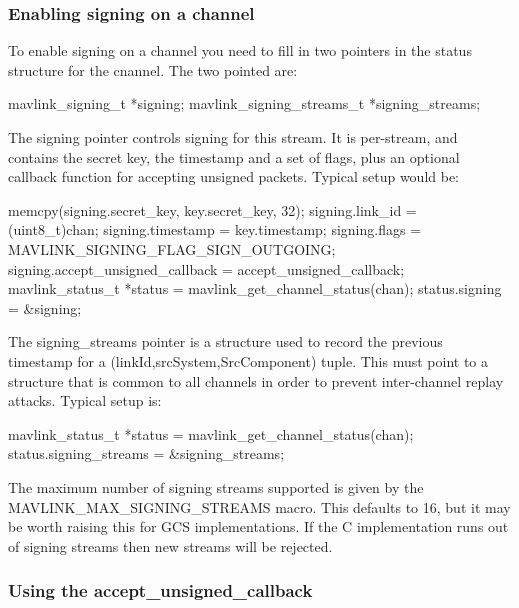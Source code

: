 \subsubsection*{Enabling signing on a channel}

To enable signing on a channel you need to fill in two pointers in the status structure for the cnannel. The two pointed are\+:


\begin{DoxyCode}
mavlink\_signing\_t *signing;
mavlink\_signing\_streams\_t *signing\_streams;
\end{DoxyCode}


The signing pointer controls signing for this stream. It is per-\/stream, and contains the secret key, the timestamp and a set of flags, plus an optional callback function for accepting unsigned packets. Typical setup would be\+:


\begin{DoxyCode}
memcpy(signing.secret\_key, key.secret\_key, 32);
signing.link\_id = (uint8\_t)chan;
signing.timestamp = key.timestamp;
signing.flags = MAVLINK\_SIGNING\_FLAG\_SIGN\_OUTGOING;
signing.accept\_unsigned\_callback = accept\_unsigned\_callback;
mavlink\_status\_t *status = mavlink\_get\_channel\_status(chan);
status.signing = &signing;
\end{DoxyCode}


The signing\+\_\+streams pointer is a structure used to record the previous timestamp for a (link\+Id,src\+System,Src\+Component) tuple. This must point to a structure that is common to all channels in order to prevent inter-\/channel replay attacks. Typical setup is\+:


\begin{DoxyCode}
mavlink\_status\_t *status = mavlink\_get\_channel\_status(chan);
status.signing\_streams = &signing\_streams;
\end{DoxyCode}


The maximum number of signing streams supported is given by the M\+A\+V\+L\+I\+N\+K\+\_\+\+M\+A\+X\+\_\+\+S\+I\+G\+N\+I\+N\+G\+\_\+\+S\+T\+R\+E\+A\+MS macro. This defaults to 16, but it may be worth raising this for G\+CS implementations. If the C implementation runs out of signing streams then new streams will be rejected.

\subsubsection*{Using the accept\+\_\+unsigned\+\_\+callback}

